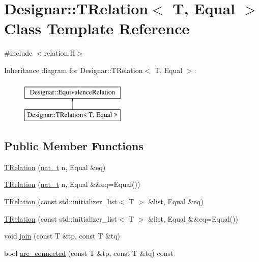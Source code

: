 \hypertarget{class_designar_1_1_t_relation}{}\section{Designar\+:\+:T\+Relation$<$ T, Equal $>$ Class Template Reference}
\label{class_designar_1_1_t_relation}


{\ttfamily \#include $<$relation.\+H$>$}

Inheritance diagram for Designar\+:\+:T\+Relation$<$ T, Equal $>$\+:\begin{figure}[H]
\begin{center}
\leavevmode
\includegraphics[height=2.000000cm]{class_designar_1_1_t_relation}
\end{center}
\end{figure}
\subsection*{Public Member Functions}
\begin{DoxyCompactItemize}
\item 
\hyperlink{class_designar_1_1_t_relation_a1f409c1d5959b2771c31e1f7e92664cf}{T\+Relation} (\hyperlink{namespace_designar_aa72662848b9f4815e7bf31a7cf3e33d1}{nat\+\_\+t} n, Equal \&eq)
\item 
\hyperlink{class_designar_1_1_t_relation_ab6e9dc668ef079b565153eb49b45629c}{T\+Relation} (\hyperlink{namespace_designar_aa72662848b9f4815e7bf31a7cf3e33d1}{nat\+\_\+t} n, Equal \&\&eq=Equal())
\item 
\hyperlink{class_designar_1_1_t_relation_a176c516d96ff9476d54b0e76497d224b}{T\+Relation} (const std\+::initializer\+\_\+list$<$ T $>$ \&list, Equal \&eq)
\item 
\hyperlink{class_designar_1_1_t_relation_ac745ed02be7d1aac2a70473fc1d4b4b7}{T\+Relation} (const std\+::initializer\+\_\+list$<$ T $>$ \&list, Equal \&\&eq=Equal())
\item 
void \hyperlink{class_designar_1_1_t_relation_a484b21a54f5d2b9862487fbb8b5ac1e7}{join} (const T \&tp, const T \&tq)
\item 
bool \hyperlink{class_designar_1_1_t_relation_a1746e01b4c0e1d96aca73ad8d6b66ad1}{are\+\_\+connected} (const T \&tp, const T \&tq) const
\end{DoxyCompactItemize}


